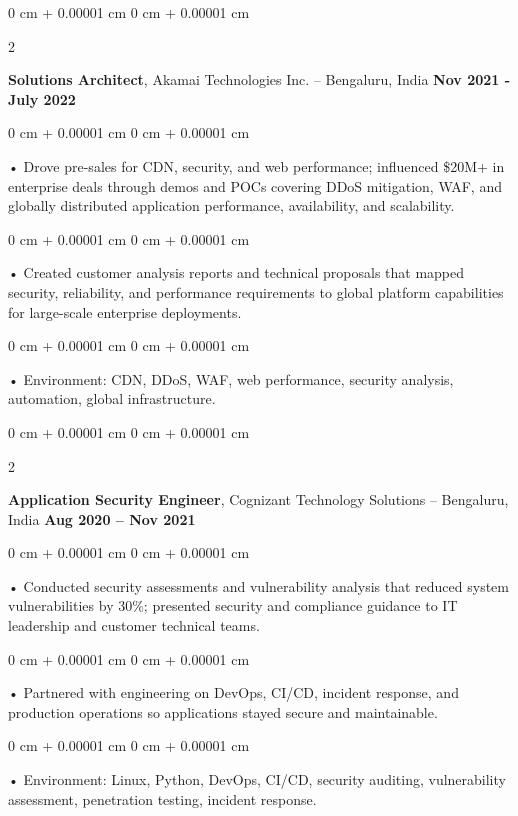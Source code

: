 \documentclass[10pt, letterpaper]{article}
\newenvironment{onecolentry}{
    \begin{adjustwidth}{
        0 cm + 0.00001 cm
    }{
        0 cm + 0.00001 cm
    }
}{
    \end{adjustwidth}
} %
\newenvironment{twocolentry}[2][]{
    \onecolentry
    \def\secondColumn{#2}
    \setcolumnwidth{\fill, 4.5 cm}
    \begin{paracol}{2}
}{
    \switchcolumn \raggedleft \secondColumn
    \end{paracol}
    \endonecolentry
} %
\begin{document}
        \begin{twocolentry}{
            \textbf{Nov 2021 - July 2022}
        }
            \textbf{Solutions Architect}, Akamai Technologies Inc. -- Bengaluru, India \end{twocolentry}
        \begin{onecolentry}
            • Drove pre-sales for CDN, security, and web performance; influenced \$20M+ in enterprise deals through demos and POCs covering DDoS mitigation, WAF, and globally distributed application performance, availability, and scalability.
        \end{onecolentry}
        \begin{onecolentry}
            • Created customer analysis reports and technical proposals that mapped security, reliability, and performance requirements to global platform capabilities for large-scale enterprise deployments.
        \end{onecolentry}
        \begin{onecolentry}
             • Environment: CDN, DDoS, WAF, web performance, security analysis, automation, global infrastructure.
        \end{onecolentry}

        \begin{twocolentry}{
            \textbf{Aug 2020 – Nov 2021}
        }
            \vspace{2 pt }
            \textbf{Application Security Engineer}, Cognizant Technology Solutions -- Bengaluru, India\end{twocolentry}
        \begin{onecolentry}
             • Conducted security assessments and vulnerability analysis that reduced system vulnerabilities by 30\%; presented security and compliance guidance to IT leadership and customer technical teams.
        \end{onecolentry}
        \begin{onecolentry}
             • Partnered with engineering on DevOps, CI/CD, incident response, and production operations so applications stayed secure and maintainable.
        \end{onecolentry}

        \begin{onecolentry}
             • Environment: Linux, Python, DevOps, CI/CD, security auditing, vulnerability assessment, penetration testing, incident response.
        \end{onecolentry}
    \vspace{2 pt }
\end{document}
